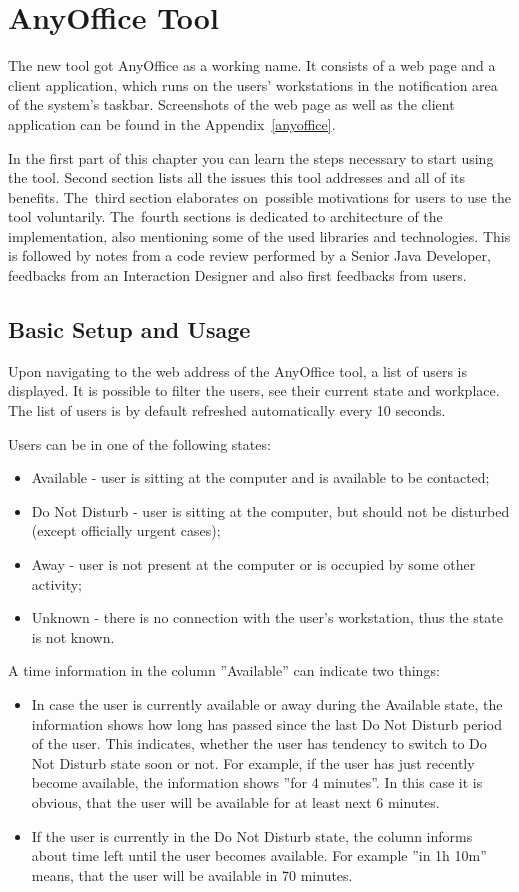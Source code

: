 \documentclass[11pt,singleside]{myfithesis2}
\begin{document}
\chapter{AnyOffice Tool}

The new tool got AnyOffice as a working name. It consists of a web page and a client application, which runs on the users' workstations in the notification area of the system's taskbar. Screenshots of the web page as well as the client application can be found in the Appendix~\ref{anyoffice}.

In the first part of this chapter you can learn the steps necessary to start using the tool. Second section lists all the issues this tool addresses and all of its benefits. The~third section elaborates on~possible motivations for users to use the tool voluntarily. The~fourth sections is dedicated to architecture of the implementation, also mentioning some of the used libraries and technologies. This is followed by notes from a code review performed by a Senior Java Developer, feedbacks from an Interaction Designer and also first feedbacks from users.


	\section{Basic Setup and Usage}
Upon navigating to the web address of the AnyOffice tool, a list of users is displayed. It is possible to filter the users, see their current state and workplace. The list of users is by default refreshed automatically every 10 seconds.

Users can be in one of the following states:
\begin{itemize}
	\item Available - user is sitting at the computer and is available to be contacted;
	\item Do Not Disturb - user is sitting at the computer, but should not be disturbed (except officially urgent cases);
	\item Away - user is not present at the computer or is occupied by some other activity;
	\item Unknown - there is no connection with the user's workstation, thus the state is not known.
\end{itemize}

A time information in the column ''Available'' can indicate two things:
\begin{itemize}
	\item In case the user is currently available or away during the Available state, the information shows how long has passed since the last Do Not Disturb period of the user. This indicates, whether the user has tendency to switch to Do Not Disturb state soon or not. For example, if the user has just recently become available, the information shows ''for 4 minutes''. In this case it is obvious, that the user will be available for at least next 6 minutes.
	\item If the user is currently in the Do Not Disturb state, the column informs about time left until the user becomes available. For example ''in 1h 10m'' means, that the user will be available in 70 minutes.
\end{itemize}
\end{document}
